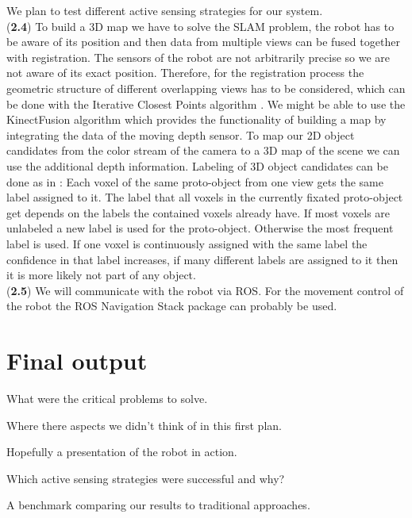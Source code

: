 \documentclass[a4paper,11pt,english]{article}
\begin{document}
We plan to test different active sensing strategies for our system.\\
(\textbf{2.4}) To build a 3D map we have to solve the SLAM problem, the robot has to be aware of its position and then data from multiple views can be fused together with registration.
The sensors of the robot are not arbitrarily precise so we are not aware of its exact position. Therefore, for the registration process the geometric structure of different overlapping views has to be considered, which can be done with the Iterative Closest Points algorithm \cite{surmann2003autonomous}.
We might be able to use the KinectFusion algorithm which provides the functionality of building a map by integrating the data of the moving depth sensor.
To map our 2D object candidates from the color stream of the camera to a 3D map of the scene we can use the additional depth information.
Labeling of 3D object candidates can be done as in \cite{garcia2013computational}:
Each voxel of the same proto-object from one view gets the same label assigned to it.
The label that all voxels in the currently fixated proto-object get depends on the labels the contained voxels already have.
If most voxels are unlabeled a new label is used for the proto-object.
Otherwise the most frequent label is used.
If one voxel is continuously assigned with the same label the confidence in that label increases, if many different labels are assigned to it then it is more likely not part of any object.\\
(\textbf{2.5}) We will communicate with the robot via ROS. For the movement control of the robot the ROS Navigation Stack package can probably be used.

\section{Final output}
What were the critical problems to solve.

Where there aspects we didn't think of in this first plan.

Hopefully a presentation of the robot in action.

Which active sensing strategies were successful and why?

A benchmark comparing our results to traditional approaches. 


\newpage


\end{document}

